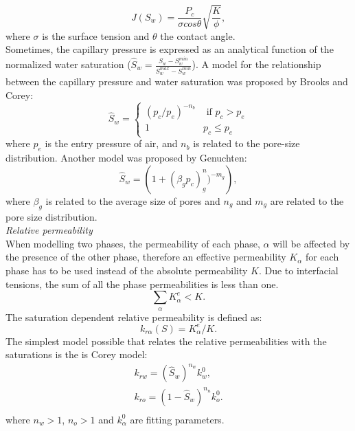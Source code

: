 \documentclass[12pt]{article}
\begin{document}
\begin{equation}
 J(S_w)=\frac{P_c}{\sigma cos \theta}\sqrt{\frac{K}{\phi}},
\end{equation}
where $\sigma$ is the surface tension and $\theta$ the contact angle.\\
Sometimes, the capillary pressure is expressed as an analytical function of the normalized water saturation ($ \hat{S}_w =\frac {S_w-S_w^ {min}}{S_w^ {max}-S_w^{min}}$).
A model for the relationship between the capillary pressure and water saturation was proposed by Brooks and Corey:
\begin{equation*}
\hat{S}_w=
\begin{cases}
(p_c/p_e)^{-n_b} & \text{ if } p_c>p_e\\
1& p_c \leq p_e
\end{cases}
\end{equation*}
where $p_e$ is the entry pressure of air, and $n_b$ is related to the pore-size distribution.
Another model was proposed by Genuchten:
\begin{equation}
 \hat{S}_w=\left( 1+(\beta_gp_c)^n_g)^{-m_g}\right),
\end{equation}
where $\beta_g$ is related to the average size of pores and $n_g$ and $m_g$ are related to the pore size distribution. \\
\emph{Relative permeability}\\
When modelling two phases, the permeability of each phase, $\alpha$ will be affected by the presence of the other phase, therefore an effective permeability $K_\alpha$ for each phase has to be used instead of the absolute permeability $K$.  
Due to interfacial tensions, the sum of all the phase permeabilities is less than one.
$$\sum_{\alpha}K_{\alpha}^e<K.$$
The saturation dependent relative permeability is defined as:
$$k_{r\alpha}(S)=K_{\alpha}^e/K.$$
The simplest model possible that relates the relative permeabilities with the saturations is the is Corey model:
\begin{equation}\label{eq:Corey}
\begin{aligned}
k_{rw}=(\hat{S}_w)^{n_w}k_w^0,\\
k_{ro}=(1-\hat{S}_w)^{n_n}k_o^0.\\
\end{aligned}
\end{equation}
where $n_w>1$, $n_o>1$ and $k_{\alpha}^0$ are fitting parameters.\\
\end{document}
